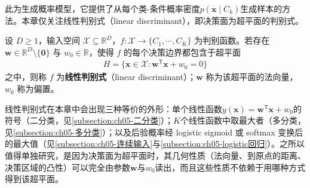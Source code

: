 \documentclass[../main.tex]{subfiles}
\begin{document}
此为生成概率模型，它提供了从每个类-条件概率密度$p(\boldsymbol{x}\mid C_k)$生成样本的方法。本章仅关注线性判别式（linear discriminant），即决策面为超平面的判别式。

\begin{definition}[线性判别式]\label{definition:ch05-线性判别式}
设 $D\geqslant1$，输入空间 $\mathcal{X}\subseteq\mathbb{R}^{D}$，$f:\mathcal{X}\to\{C_1,\cdots,C_K\}$ 为判别函数。若存在 $\boldsymbol{w}\in\mathbb{R}^{D}\setminus\{\boldsymbol{0}\}$ 与 $w_0\in\mathbb{R}$，使得 $f$ 的每个决策边界都包含于超平面
\begin{align*}
  H=\{\boldsymbol{x}\in\mathcal{X}:\boldsymbol{w}^{\mathsf{T}}\boldsymbol{x}+w_0=0\}
\end{align*}
之中，则称 $f$ 为\textbf{线性判别式}（linear discriminant）；$\boldsymbol{w}$ 称为该超平面的法向量，$w_0$ 称为偏置。
\end{definition}

\begin{remark}
线性判别式在本章中会出现三种等价的外形：单个线性函数$y(\boldsymbol{x})=\boldsymbol{w}^{\mathsf{T}}\boldsymbol{x}+w_0$的符号（二分类，见\cref{subsection:ch05-二分类}）；$K$个线性函数中取最大者（多分类，见\cref{subsection:ch05-多分类}）；以及后验概率经 logistic sigmoid 或 softmax 变换后的最大值（见\cref{subsection:ch05-连续输入}与\cref{subsection:ch05-logistic回归}）。之所以值得单独研究，是因为决策面为超平面时，其几何性质（法向量、到原点的距离、决策区域的凸性）可以完全由参数$\boldsymbol{w}$与$w_0$读出，而且这些性质不依赖于用哪种方式得到该超平面。
\end{remark}






\end{document}
